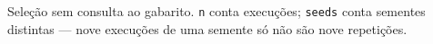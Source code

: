 \footnotesize Seleção sem consulta ao gabarito. \texttt{n} conta execuções; \texttt{seeds} conta sementes distintas --- nove execuções de uma semente só não são nove repetições.
\normalsize
